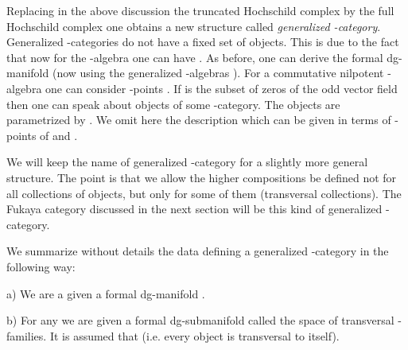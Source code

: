 \documentclass[a4paper,12pt]{article}
\begin{document}
Replacing in the above discussion the truncated Hochschild complex
by the full Hochschild complex one obtains a new structure called
{\it generalized \myHighlight{$\A$}\coordHE{}-category}. Generalized \myHighlight{$\A$}\coordHE{}-categories do not
have a fixed set of objects. This is due to the fact that now for
the \myHighlight{$\A$}\coordHE{}-algebra \coordHE{} one can have \coordHE{}.
As before, one can derive the formal dg-manifold \coordHE{} 
(now using the generalized \myHighlight{$\A$}\coordHE{}-algebras \coordHE{}). For a commutative
nilpotent \coordHE{}-algebra  \coordHE{} one can consider
\coordHE{}-points \coordHE{}. 
If \coordHE{} is the
subset of zeros of the odd vector field \coordHE{} then one can speak
about objects of some \myHighlight{$\A$}\coordHE{}-category.  The objects are parametrized by \coordHE{}.
We omit here the description which can be given
in terms of \coordHE{}-points of  \coordHE{} and \coordHE{}.












We will keep the name of generalized \myHighlight{$\A$}\coordHE{}-category
for a slightly more general structure. The point
is that we allow the higher compositions \coordHE{}  be defined not for all
collections of objects, but only for some of them
(transversal collections). The Fukaya category discussed
in the next section will be this kind of generalized \myHighlight{$\A$}\coordHE{}-category.

We  summarize without details the data defining a generalized \myHighlight{$\A$}\coordHE{}-category 
in the following way:

a) We are a given a formal dg-manifold  \coordHE{}.

b) For any \coordHE{} we are given a formal dg-submanifold 
\coordHE{} called the space of transversal \coordHE{}-families.
It is assumed that \coordHE{} (i.e.
every object is transversal to itself).
\end{document}
